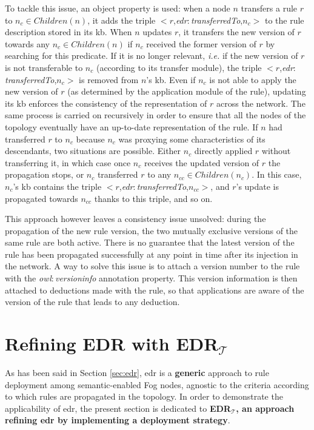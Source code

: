 \documentclass[sw]{iosart2x}
\newcommand{\edrt}{EDR$_{\mathcal{T}}$\xspace}
\newcommand{\namespace}[1]{\textit{#1$:$}}
\newcommand{\concept}[2]{\namespace{#1}\-\textit{#2}}
\newcommand{\triplet}[3]{$<$#1,\textit{#2},#3$>$}
\begin{document}
To tackle this issue, an object property is used: when a node $n$ transfers a rule $r$ to $n_{c}\in Children(n)$, it adds the triple \triplet{$r$}{\concept{edr}{transferred\-To}}{$n_{c}$} to the rule description stored in its \gls{kb}.
When $n$ updates $r$, it transfers the new version of $r$ towards any $n_c \in Children(n)$ if $n_c$ received the former version of $r$ by searching for this predicate. 
If it is no longer relevant, \textit{i.e.} if the new version of $r$ is not transferable to $n_c$ (according to its transfer module), the triple \triplet{$r$}{\concept{edr}{transferred\-To}}{$n_{c}$} is removed from $n$'s \gls{kb}.
Even if $n_c$ is not able to apply the new version of $r$ (as determined by the application module of the rule), updating its \gls{kb} enforces the consistency of the representation of $r$ across the network. 
The same process is carried on recursively in order to ensure that all the nodes of the topology eventually have an up-to-date representation of the rule.
If $n$ had transferred $r$ to $n_c$ because $n_c$ was proxying some characteristics of its descendants, two situations are possible. 
Either $n_c$ directly applied $r$ without transferring it, in which case once $n_c$ receives the updated version of $r$ the propagation stops, or $n_c$ transferred $r$ to any $n_{cc}\in Children(n_c)$.
In this case, $n_c$'s \gls{kb} contains the triple \triplet{$r$}{\concept{edr}{transferred\-To}}{$n_{cc}$}, and $r$'s update is propagated towards $n_{cc}$ thanks to this triple, and so on.

This approach however leaves a consistency issue unsolved: during the propagation of the new rule version, the two mutually exclusive versions of the same rule are both active. 
There is no guarantee that the latest version of the rule has been propagated successfully at any point in time after its injection in the network.
A way to solve this issue is to attach a version number to the rule with the \concept{owl}{version\-info} annotation property.
This version information is then attached to deductions made with the rule, so that applications are aware of the version of the rule that leads to any deduction.

\section{Refining EDR with \edrt}
\label{sec:edrpt}

As has been said in Section \textsection \ref{sec:edr}, \gls{edr} is a \textbf{generic} approach to rule deployment among semantic-enabled Fog nodes, agnostic to the criteria according to which rules are propagated in the topology.
In order to demonstrate the applicability of \gls{edr}, the present section is dedicated to \textbf{\edrt, an approach refining \gls{edr} by implementing a deployment strategy}.
\end{document}
